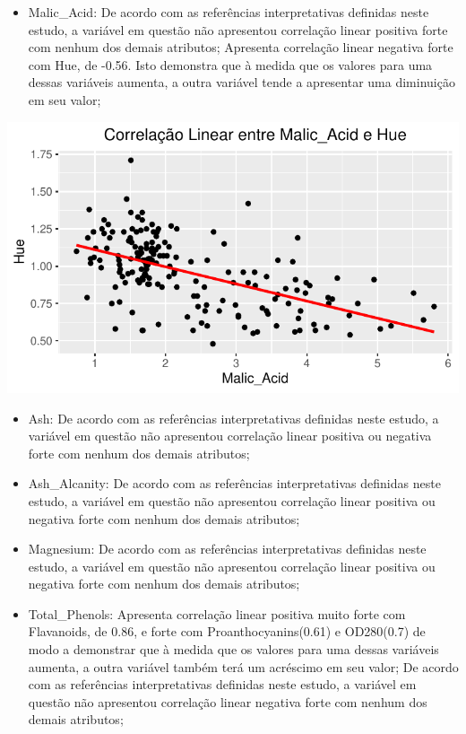 \documentclass[
  letterpaper,
  DIV=11,
  numbers=noendperiod]{scrartcl}
\providecommand{\tightlist}{%
  \setlength{\itemsep}{0pt}\setlength{\parskip}{0pt}}\usepackage{longtable,booktabs,array}
\begin{document}
\begin{itemize}
\tightlist
\item
  Malic\_Acid: De acordo com as referências interpretativas definidas
  neste estudo, a variável em questão não apresentou correlação linear
  positiva forte com nenhum dos demais atributos; Apresenta correlação
  linear negativa forte com Hue, de -0.56. Isto demonstra que à medida
  que os valores para uma dessas variáveis aumenta, a outra variável
  tende a apresentar uma diminuição em seu valor;
\end{itemize}

\begin{center}
\includegraphics{wines_analysis_files/figure-pdf/unnamed-chunk-9-1.pdf}
\end{center}

\begin{itemize}
\item
  Ash: De acordo com as referências interpretativas definidas neste
  estudo, a variável em questão não apresentou correlação linear
  positiva ou negativa forte com nenhum dos demais atributos;
\item
  Ash\_Alcanity: De acordo com as referências interpretativas definidas
  neste estudo, a variável em questão não apresentou correlação linear
  positiva ou negativa forte com nenhum dos demais atributos;
\item
  Magnesium: De acordo com as referências interpretativas definidas
  neste estudo, a variável em questão não apresentou correlação linear
  positiva ou negativa forte com nenhum dos demais atributos;
\item
  Total\_Phenols: Apresenta correlação linear positiva muito forte com
  Flavanoids, de 0.86, e forte com Proanthocyanins(0.61) e OD280(0.7) de
  modo a demonstrar que à medida que os valores para uma dessas
  variáveis aumenta, a outra variável também terá um acréscimo em seu
  valor; De acordo com as referências interpretativas definidas neste
  estudo, a variável em questão não apresentou correlação linear
  negativa forte com nenhum dos demais atributos;
\end{itemize}
\end{document}
